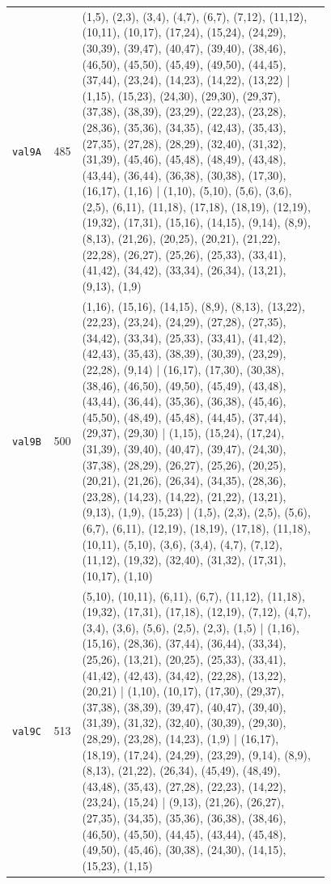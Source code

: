 \begin{landscape}
\begin{longtable}{lr>{\tiny\raggedright\arraybackslash}p{0.78\linewidth}}
\texttt{val9A} & 485 & (1,5), (2,3), (3,4), (4,7), (6,7), (7,12), (11,12), (10,11), (10,17), (17,24), (15,24), (24,29), (30,39), (39,47), (40,47), (39,40), (38,46), (46,50), (45,50), (45,49), (49,50), (44,45), (37,44), (23,24), (14,23), (14,22), (13,22) | (1,15), (15,23), (24,30), (29,30), (29,37), (37,38), (38,39), (23,29), (22,23), (23,28), (28,36), (35,36), (34,35), (42,43), (35,43), (27,35), (27,28), (28,29), (32,40), (31,32), (31,39), (45,46), (45,48), (48,49), (43,48), (43,44), (36,44), (36,38), (30,38), (17,30), (16,17), (1,16) | (1,10), (5,10), (5,6), (3,6), (2,5), (6,11), (11,18), (17,18), (18,19), (12,19), (19,32), (17,31), (15,16), (14,15), (9,14), (8,9), (8,13), (21,26), (20,25), (20,21), (21,22), (22,28), (26,27), (25,26), (25,33), (33,41), (41,42), (34,42), (33,34), (26,34), (13,21), (9,13), (1,9) \\[2pt]
\texttt{val9B} & 500 & (1,16), (15,16), (14,15), (8,9), (8,13), (13,22), (22,23), (23,24), (24,29), (27,28), (27,35), (34,42), (33,34), (25,33), (33,41), (41,42), (42,43), (35,43), (38,39), (30,39), (23,29), (22,28), (9,14) | (16,17), (17,30), (30,38), (38,46), (46,50), (49,50), (45,49), (43,48), (43,44), (36,44), (35,36), (36,38), (45,46), (45,50), (48,49), (45,48), (44,45), (37,44), (29,37), (29,30) | (1,15), (15,24), (17,24), (31,39), (39,40), (40,47), (39,47), (24,30), (37,38), (28,29), (26,27), (25,26), (20,25), (20,21), (21,26), (26,34), (34,35), (28,36), (23,28), (14,23), (14,22), (21,22), (13,21), (9,13), (1,9), (15,23) | (1,5), (2,3), (2,5), (5,6), (6,7), (6,11), (12,19), (18,19), (17,18), (11,18), (10,11), (5,10), (3,6), (3,4), (4,7), (7,12), (11,12), (19,32), (32,40), (31,32), (17,31), (10,17), (1,10) \\[2pt]
\texttt{val9C} & 513 & (5,10), (10,11), (6,11), (6,7), (11,12), (11,18), (19,32), (17,31), (17,18), (12,19), (7,12), (4,7), (3,4), (3,6), (5,6), (2,5), (2,3), (1,5) | (1,16), (15,16), (28,36), (37,44), (36,44), (33,34), (25,26), (13,21), (20,25), (25,33), (33,41), (41,42), (42,43), (34,42), (22,28), (13,22), (20,21) | (1,10), (10,17), (17,30), (29,37), (37,38), (38,39), (39,47), (40,47), (39,40), (31,39), (31,32), (32,40), (30,39), (29,30), (28,29), (23,28), (14,23), (1,9) | (16,17), (18,19), (17,24), (24,29), (23,29), (9,14), (8,9), (8,13), (21,22), (26,34), (45,49), (48,49), (43,48), (35,43), (27,28), (22,23), (14,22), (23,24), (15,24) | (9,13), (21,26), (26,27), (27,35), (34,35), (35,36), (36,38), (38,46), (46,50), (45,50), (44,45), (43,44), (45,48), (49,50), (45,46), (30,38), (24,30), (14,15), (15,23), (1,15) \\[2pt]

\end{longtable}
\end{landscape}
